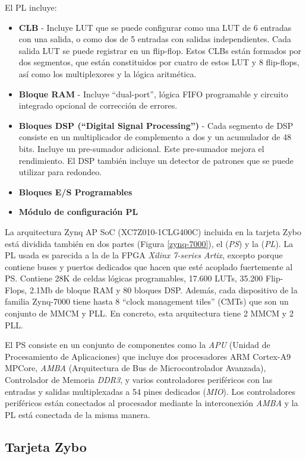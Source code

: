 El PL incluye:

\begin{itemize}
    \item \textbf{CLB} - Incluye LUT que se puede configurar como una LUT de 6 entradas con una salida, o como dos de 5 entradas con salidas independientes. 
    Cada salida LUT se puede registrar en un flip-flop. Estos CLBs están formados por dos segmentos, que están constituidos por cuatro de estos LUT y 8 flip-flops, así como 
    los multiplexores y la lógica aritmética.
    \item \textbf{Bloque RAM} - Incluye ``dual-port'', lógica FIFO programable y circuito integrado opcional de corrección de errores.
    \item \textbf{Bloques DSP (``Digital Signal Processing'')} - Cada segmento de DSP consiste en un multiplicador de complemento a dos y un acumulador de 48 bits. Incluye un 
    pre-sumador adicional. Este pre-sumador mejora el rendimiento. El DSP también incluye un detector de patrones que se puede utilizar para redondeo.
    \item \textbf{Bloques E/S Programables}
    \item \textbf{Módulo de configuración PL}
\end{itemize}

La arquitectura Zynq AP SoC (XC7Z010-1CLG400C) incluida en la tarjeta Zybo está dividida también en dos partes (Figura \ref{zynq-7000}), el (\textit{PS}) y la (\textit{PL}). 
La PL usada es parecida a la de la FPGA \textit{Xilinx 7-series Artix}, excepto porque contiene buses y puertos dedicados que hacen que esté 
acoplado fuertemente al PS. Contiene 28K de celdas lógicas programables, 17.600 LUTs, 35.200 Flip-Flops, 2.1Mb de bloque RAM y 80 bloques DSP. Además, 
cada dispositivo de la familia Zynq-7000 tiene hasta 8 ``clock management tiles'' (CMTs) que son un conjunto de MMCM y PLL. En concreto, esta arquitectura tiene 2 MMCM 
y 2 PLL.

El PS consiste en un conjunto de componentes como la \textit{APU} (Unidad de Procesamiento de Aplicaciones) que incluye dos procesadores ARM Cortex-A9 MPCore, 
\textit{AMBA} (Arquitectura de Bus de Microcontrolador Avanzada), Controlador de Memoria \textit{DDR3}, y varios controladores periféricos con 
las entradas y salidas multiplexadas a 54 pines dedicados (\textit{MIO}). Los controladores periféricos están conectados al procesador mediante 
la interconexión \textit{AMBA} y la PL está conectada de la misma manera.

\subsection{Tarjeta Zybo}

